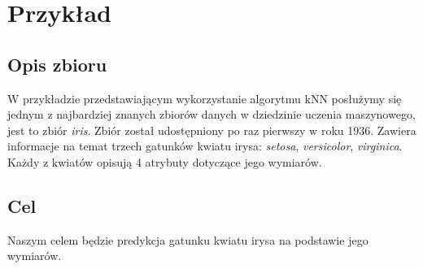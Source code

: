 \documentclass[a4paper]{article}
\begin{document}
\section{Przykład}
\subsection{Opis zbioru}
W przykładzie przedstawiającym wykorzystanie algorytmu kNN posłużymy się jednym z najbardziej znanych zbiorów danych w dziedzinie uczenia maszynowego, jest to zbiór \textit{iris}. Zbiór został udostępniony po raz pierwszy w roku 1936. Zawiera informacje na temat trzech gatunków kwiatu irysa: \textit{setosa}, \textit{versicolor}, \textit{virginica}. Każdy z kwiatów opisują 4 atrybuty dotyczące jego wymiarów.
\subsection{Cel}
Naszym celem będzie predykcja gatunku kwiatu irysa na podstawie jego wymiarów.
\end{document}
